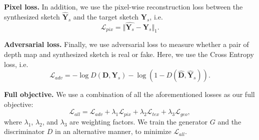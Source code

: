 \documentclass[10pt,twocolumn,letterpaper]{article}
\begin{document}
\textbf{Pixel loss.}
In addition, we use the pixel-wise reconstruction loss between the synthesized sketch $\hat{\mathbf{Y}}_s$ and the target sketch $\mathbf{Y}_s$, i.e. %
\begin{equation}
	\mathcal{L}_{pix} = \Vert \hat{\mathbf{Y}_s} - \mathbf{Y}_s \Vert_1.
\end{equation}

\textbf{Adversarial loss.}
Finally, we use adversarial loss to measure whether a pair of depth map and synthesized sketch is real or fake. Here, we use the Cross Entropy loss, i.e. 
\begin{equation}
	\mathcal{L}_{adv} = -\log D(\mathbf{D}, \mathbf{Y}_s) 
	- \log (1-D(\hat{\mathbf{D}}, \hat{\mathbf{Y}}_s)).
\end{equation}

\textbf{Full objective.}
We use a combination of all the aforementioned losses as our full objective:
\begin{equation}
	\mathcal{L}_{all} = \mathcal{L}_{adv} + \lambda_1 \mathcal{L}_{pix} + \lambda_2 \mathcal{L}_{tex} + \lambda_3 \mathcal{L}_{geo},
\end{equation}
where $\lambda_1$, $\lambda_2$, and $\lambda_3$ are weighting factors. We train the generator $G$ and the discriminator $D$ in an alternative manner, to minimize $\mathcal{L}_{all}$. 

\end{document}
